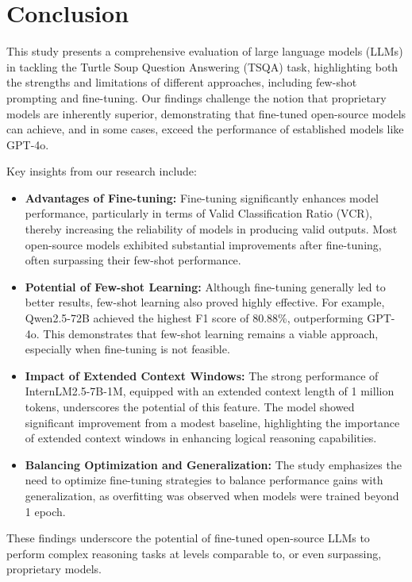\section{Conclusion}

This study presents a comprehensive evaluation of large language models (LLMs) in tackling the Turtle Soup Question Answering (TSQA) task, highlighting both the strengths and limitations of different approaches, including few-shot prompting and fine-tuning. Our findings challenge the notion that proprietary models are inherently superior, demonstrating that fine-tuned open-source models can achieve, and in some cases, exceed the performance of established models like GPT-4o.

Key insights from our research include:

\begin{itemize}
    \item \textbf{Advantages of Fine-tuning:} Fine-tuning significantly enhances model performance, particularly in terms of Valid Classification Ratio (VCR), thereby increasing the reliability of models in producing valid outputs. Most open-source models exhibited substantial improvements after fine-tuning, often surpassing their few-shot performance.
    
    \item \textbf{Potential of Few-shot Learning:} Although fine-tuning generally led to better results, few-shot learning also proved highly effective. For example, Qwen2.5-72B achieved the highest F1 score of 80.88\%, outperforming GPT-4o. This demonstrates that few-shot learning remains a viable approach, especially when fine-tuning is not feasible.
    
    \item \textbf{Impact of Extended Context Windows:} The strong performance of InternLM2.5-7B-1M, equipped with an extended context length of 1 million tokens, underscores the potential of this feature. The model showed significant improvement from a modest baseline, highlighting the importance of extended context windows in enhancing logical reasoning capabilities.
    
    \item \textbf{Balancing Optimization and Generalization:} The study emphasizes the need to optimize fine-tuning strategies to balance performance gains with generalization, as overfitting was observed when models were trained beyond 1 epoch.
\end{itemize}

These findings underscore the potential of fine-tuned open-source LLMs to perform complex reasoning tasks at levels comparable to, or even surpassing, proprietary models.

